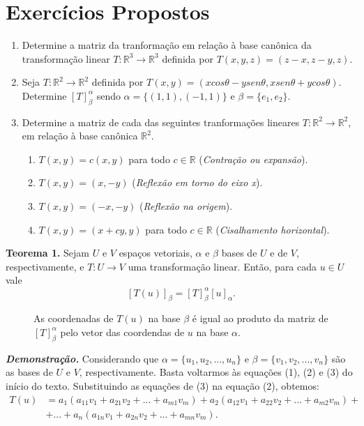 \section{Exercícios Propostos}
\begin{enumerate}
\item Determine  a matriz da tranformação  em relação à base canônica  da transformação linear $T: \mathbb{R}^3 \rightarrow \mathbb{R}^3$ definida por $T(x,y, z)=(z-x,z-y,z)$.


\item  Seja $T: \mathbb{R}^2 \rightarrow \mathbb{R}^2$ definida por $T(x,y)=(xcos\theta - ysen\theta,xsen\theta+ ycos\theta)$. Determine $[T]_{\beta}^{\alpha}$ sendo $\alpha =\{(1,1), (-1, 1) \}$ e $\beta =\{ e_1, e_2\}$.

\item Determine  a matriz de cada das seguintes tranformações  lineares $T: \mathbb{R}^2 \rightarrow \mathbb{R}^2$,  em relação à base canônica  $\mathbb{R}^2$.
\begin{enumerate}
\item  $T(x,y)=c(x,y)$ para todo $c \in \mathbb{R}$ (\textit{Contração ou expansão}).
\item  $T(x,y)=(x,-y)$  (\textit{Reflexão em torno do eixo x}).
\item $T(x,y)=(-x,-y)$  (\textit{Reflexão na origem}).
\item  $T(x,y)=(x+cy,y)$ para todo $c \in \mathbb{R}$ (\textit{Cisalhamento horizontal}).
\end{enumerate}
\end{enumerate}

\noindent\textbf{Teorema 1.} Sejam $U$ e $V$ espaços vetoriais, $\alpha$ e $\beta$ bases de $U$ e de $V$, respectivamente, e $T: U \rightarrow V$ uma transformação linear. Então, para cada $u\in U$ vale $$ [T(u)]_{\beta}=[T]_{\beta}^{\alpha}[u]_{\alpha}.$$

\begin{figure}[h]
\center
\caption{\footnotesize{As coordenadas de $T(u)$ na base $\beta$ é igual ao produto da matriz de $[T]_{\beta}^{\alpha}$ pelo vetor das coordendas de $u$ na base $\alpha$.}}
\label{fig:exp}
\end{figure}



\noindent\textit{\textbf{Demonstração.}} Considerando que  $\alpha =\{u_1, u_2, ..., u_n\}$ e $\beta =\{v_1, v_2, ..., v_n\}$ são as bases de $U$ e $V$, respectivamente. Basta voltarmos às equações (1), (2) e (3) do início do texto.  Substituindo as equações de (3) na equação (2), obtemos:
\begin{align}
T(u)&=a_1(a_{11}v_1+ a_{21}v_2+ ...+a_{m1}v_m)+ a_2(a_{12}v_1+ a_{22}v_2+ ...+a_{m2}v_m )+ \nonumber\\
       & + ...+a_n(a_{1n}v_1+ a_{2n}v_2+ ...+a_{mn}v_m).
\end{align}

